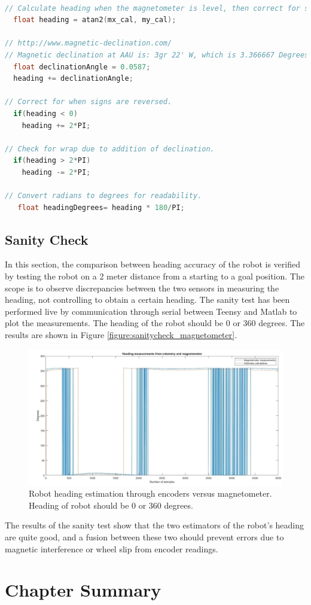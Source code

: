 

\begin{lstlisting}[language=C++, caption={Adding declination angle to the heading measurement.}, label={code:magnetometer}]

// Calculate heading when the magnetometer is level, then correct for signs of axis.
  float heading = atan2(mx_cal, my_cal);

// http://www.magnetic-declination.com/
// Magnetic declination at AAU is: 3gr 22' W, which is 3.366667 Degrees, or 0.058759423968 radians.
  float declinationAngle = 0.0587;
  heading += declinationAngle;

// Correct for when signs are reversed.
  if(heading < 0)
    heading += 2*PI;

// Check for wrap due to addition of declination.
  if(heading > 2*PI)
    heading -= 2*PI;

// Convert radians to degrees for readability.
   float headingDegrees= heading * 180/PI;

\end{lstlisting}

\subsection{Sanity Check}

In this section, the comparison between heading accuracy of the robot is verified by testing the robot on a 2 meter distance from a starting to a goal position. The scope is to observe discrepancies between the two sensors in measuring the heading, not controlling to obtain a certain heading. The sanity test has been performed live by communication through serial between Teensy and Matlab to plot the measurements. The heading of the robot should be 0 or 360 degrees. The results are shown in Figure \ref{figure:sanitycheck_magnetometer}.

\begin{figure}[H]
\includegraphics[scale=0.45]{Figures/sanity_check_mag.jpg}
\centering
\caption{Robot heading estimation through encoders versus magnetometer. Heading of robot should be 0 or 360 degrees.}
\label{figure:sanitycheck_mag}
\end{figure}

The results of the sanity test show that the two estimators of the robot's heading are quite good, and a fusion between these two should prevent errors due to magnetic interference or wheel slip from encoder readings.

\section{Chapter Summary}


